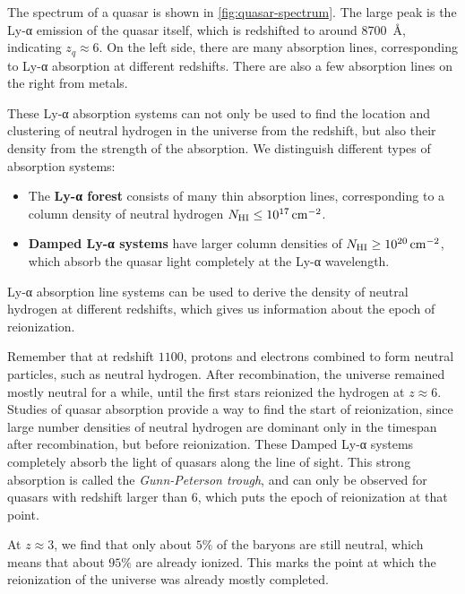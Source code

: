 The spectrum of a quasar is shown in \cref{fig:quasar-spectrum}.
The large peak is the Ly-α emission of the quasar itself, which is redshifted to around \SI{8700}{\angstrom}, indicating $z_q \approx 6$.
On the left side, there are many absorption lines, corresponding to Ly-α absorption at different redshifts.
There are also a few absorption lines on the right from metals.

These Ly-α absorption systems can not only be used to find the location and clustering of neutral hydrogen in the universe from the redshift, but also their density from the strength of the absorption.
We distinguish different types of absorption systems:
\begin{itemize}
	\item The \textbf{Ly-α forest} consists of many thin absorption lines,
	corresponding to a column density of neutral hydrogen $N_{\mathrm{H}\textsc{I}} \leq \SI{e17}{\centi\meter\tothe{-2}}$.
	\item \textbf{Damped Ly-α systems} have larger column densities of $N_{\mathrm{H}\textsc{I}} \geq \SI{e20}{\centi\meter\tothe{-2}}$,
	which absorb the quasar light completely at the Ly-α wavelength.
\end{itemize}

Ly-α absorption line systems can be used to derive the density of neutral hydrogen at different redshifts, which gives us information about the epoch of reionization.

Remember that at redshift $1100$, protons and electrons combined to form neutral particles, such as neutral hydrogen.
After recombination, the universe remained mostly neutral for a while, until the first stars reionized the hydrogen at $z \approx 6$.
Studies of quasar absorption provide a way to find the start of reionization, since large number densities of neutral hydrogen are dominant only in the timespan after recombination, but before reionization.
These Damped Ly-α systems completely absorb the light of quasars along the line of sight.
This strong absorption is called the \emph{Gunn-Peterson trough}, and can only be observed for quasars with redshift larger than $6$, which puts the epoch of reionization at that point.

At $z \approx 3$, we find that only about $5 \%$ of the baryons are still neutral, which means that about $95 \%$ are already ionized.
This marks the point at which the reionization of the universe was already mostly completed.



